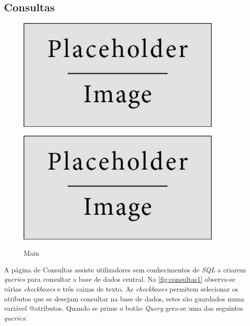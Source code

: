 \documentclass[11pt,twoside,a4paper]{report}
\begin{document}
\subsection{Consultas}
\begin{figure}[H]
	\centering
	\begin{minipage}{.5\textwidth}
		\begin{center}
			\includegraphics[width=0.9\textwidth]{placeholder} %
			\label{fig:consultas1}
		\end{center}
	\end{minipage}%
	\begin{minipage}{.5\textwidth}
		\begin{center}
			\includegraphics[width=0.9\textwidth]{placeholder} %
			\label{fig:consultas2}
		\end{center}
	\end{minipage}
	\caption{Main}
	\label{fig:consultas0}
\end{figure}
A página de Consultas assiste utilizadores sem conhecimentos de \textit{SQL} a criarem \textit{queries} para consultar a base de dados central. Na \autoref{fig:consultas1} observa-se várias \textit{checkboxes} e três caixas de texto. As \textit{checkboxes} permitem selecionar os atributos que se desejam consultar na base de dados, estes são guardados numa variável @atributos. Quando  se prime o botão \textit{Query} gera-se uma das seguintes \textit{queries}:\\
\end{document}
